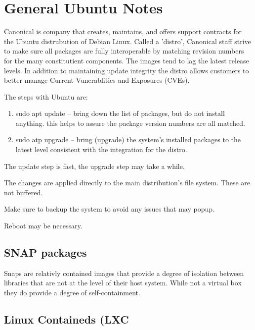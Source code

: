 \renewcommand{\footerfilename}{ubuntu.tex}

\section{General Ubuntu Notes}


Canonical is company that creates, maintains, and offers support contracts for
the Ubuntu distrubution of Debian Linux. Called a 'distro', Canonical staff 
strive to make sure all packages are fully interoperable by matching revision
numbers for the many constitutient components. The images tend to lag the 
latest release levels. In addition to maintaining update integrity the distro
allows customers to better manage Current Vunerablities and Exposures (CVEs).

The steps with Ubuntu are:
\vspace{-.15cm}
\begin{enumerate}\addtolength{\itemsep}{-0.5\baselineskip}
   \item   sudo apt update -- bring down the list of packages, but do not install anything.
     this helps to assure the package version numbers are all matched.
   \item   sudo atp upgrade -- bring (upgrade) the system's installed packages to the latest
     level consistent with the integration for the distro.
\end{enumerate}

The update step is fast, the upgrade step may take a while.

The changes are applied directly to the main distribution's file system. These are not
buffered. 

Make sure to backup the system to avoid any issues that may popup.

Reboot may be necessary.

\subsection{SNAP packages}

Snaps are relativly contained images that provide a degree of isolation between 
libraries that are not at the level of their host system. While not a virtual
box they do provide a degree of self-containment. 

\subsection{Linux Containeds (LXC}

